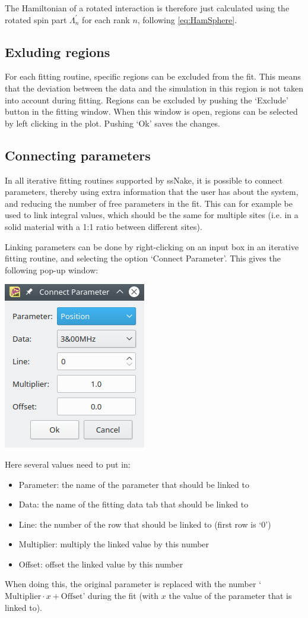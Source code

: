 \documentclass[11pt,a4paper]{article}
\begin{document}
The Hamiltonian of a rotated interaction is therefore just calculated using the rotated spin part
$\Lambda^\prime_n$ for each rank $n$, following \autoref{eq:HamSphere}.

\subsection{Exluding regions}
For each fitting routine, specific regions can be excluded from the fit. This means that the deviation between the data and the simulation in this region is not taken into account during fitting. Regions can be excluded by pushing the `Exclude' button in the fitting window. When this window is open, regions can be selected by left clicking in the plot. Pushing `Ok' saves the changes.

\subsection{Connecting parameters}
In all iterative fitting routines supported by ssNake, it is possible to connect parameters, thereby using
extra information that the user has about the system, and reducing the number of free parameters in
the fit. This can for example be used to link integral values, which should be the same for multiple
sites (i.e. in a solid material with a 1:1 ratio between different sites).

Linking parameters can be done by right-clicking on an input box in an iterative fitting
routine, and selecting the option `Connect Parameter'. This gives the following pop-up window:
\begin{center}
\includegraphics[width=0.3\linewidth]{Images/ConnectPars.png}
\end{center}

Here several values need to put in:
\begin{itemize}
  \item Parameter: the name of the parameter that should be linked to
  \item Data: the name of the fitting data tab that should be linked to
  \item Line: the number of the row that should be linked to (first row is `0')
  \item Multiplier: multiply the linked value by this number
  \item Offset: offset the linked value by this number
\end{itemize}
When doing this, the original parameter is replaced with the number `$\text{Multiplier} \cdot x +
\text{Offset}$' during the fit (with $x$ the value of the parameter that is linked to).
\end{document}
